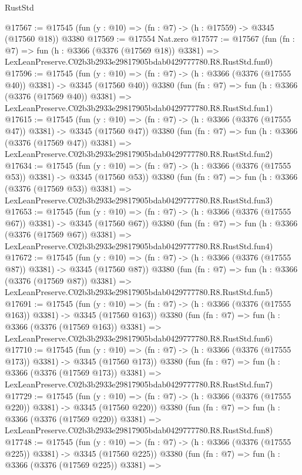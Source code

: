 \begin{lexlean}{RustStd}
\begin{coremodule}
@17567 := @17545 (fun (y : @10) => (fn : @7) -> (h : @17559) -> @3345 (@17560 @18)) @3380
@17569 := @17554 Nat.zero
@17577 := @17567
    (fun (fn : @7) =>
    fun (h : @3366 (@3376 (@17569 @18)) @3381) =>
    LexLeanPreserve.C02b3b2933e29817905bdab0429777780.R8.RustStd.fun0)
@17596 := @17545
    (fun (y : @10) => (fn : @7) -> (h : @3366 (@3376 (@17555 @40)) @3381) -> @3345 (@17560 @40))
    @3380
    (fun (fn : @7) =>
    fun (h : @3366 (@3376 (@17569 @40)) @3381) =>
    LexLeanPreserve.C02b3b2933e29817905bdab0429777780.R8.RustStd.fun1)
@17615 := @17545
    (fun (y : @10) => (fn : @7) -> (h : @3366 (@3376 (@17555 @47)) @3381) -> @3345 (@17560 @47))
    @3380
    (fun (fn : @7) =>
    fun (h : @3366 (@3376 (@17569 @47)) @3381) =>
    LexLeanPreserve.C02b3b2933e29817905bdab0429777780.R8.RustStd.fun2)
@17634 := @17545
    (fun (y : @10) => (fn : @7) -> (h : @3366 (@3376 (@17555 @53)) @3381) -> @3345 (@17560 @53))
    @3380
    (fun (fn : @7) =>
    fun (h : @3366 (@3376 (@17569 @53)) @3381) =>
    LexLeanPreserve.C02b3b2933e29817905bdab0429777780.R8.RustStd.fun3)
@17653 := @17545
    (fun (y : @10) => (fn : @7) -> (h : @3366 (@3376 (@17555 @67)) @3381) -> @3345 (@17560 @67))
    @3380
    (fun (fn : @7) =>
    fun (h : @3366 (@3376 (@17569 @67)) @3381) =>
    LexLeanPreserve.C02b3b2933e29817905bdab0429777780.R8.RustStd.fun4)
@17672 := @17545
    (fun (y : @10) => (fn : @7) -> (h : @3366 (@3376 (@17555 @87)) @3381) -> @3345 (@17560 @87))
    @3380
    (fun (fn : @7) =>
    fun (h : @3366 (@3376 (@17569 @87)) @3381) =>
    LexLeanPreserve.C02b3b2933e29817905bdab0429777780.R8.RustStd.fun5)
@17691 := @17545
    (fun (y : @10) => (fn : @7) -> (h : @3366 (@3376 (@17555 @163)) @3381) -> @3345 (@17560 @163))
    @3380
    (fun (fn : @7) =>
    fun (h : @3366 (@3376 (@17569 @163)) @3381) =>
    LexLeanPreserve.C02b3b2933e29817905bdab0429777780.R8.RustStd.fun6)
@17710 := @17545
    (fun (y : @10) => (fn : @7) -> (h : @3366 (@3376 (@17555 @173)) @3381) -> @3345 (@17560 @173))
    @3380
    (fun (fn : @7) =>
    fun (h : @3366 (@3376 (@17569 @173)) @3381) =>
    LexLeanPreserve.C02b3b2933e29817905bdab0429777780.R8.RustStd.fun7)
@17729 := @17545
    (fun (y : @10) => (fn : @7) -> (h : @3366 (@3376 (@17555 @220)) @3381) -> @3345 (@17560 @220))
    @3380
    (fun (fn : @7) =>
    fun (h : @3366 (@3376 (@17569 @220)) @3381) =>
    LexLeanPreserve.C02b3b2933e29817905bdab0429777780.R8.RustStd.fun8)
@17748 := @17545
    (fun (y : @10) => (fn : @7) -> (h : @3366 (@3376 (@17555 @225)) @3381) -> @3345 (@17560 @225))
    @3380
    (fun (fn : @7) =>
    fun (h : @3366 (@3376 (@17569 @225)) @3381) =>

\end{coremodule}
\end{lexlean}
